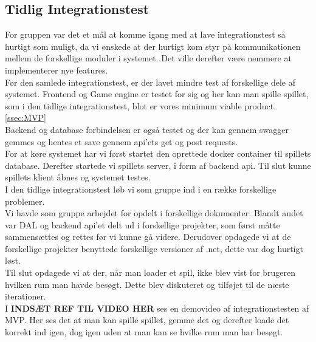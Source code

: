 \subsection{Tidlig Integrationstest}
For gruppen var det et mål at komme igang med at lave integrationstest så hurtigt som muligt, da vi ønskede at der hurtigt kom styr på kommunikationen mellem de forskellige moduler i systemet. Det ville derefter være nemmere at implementerer nye features.\\

Før den samlede integrationstest, er der lavet mindre test af forskellige dele af systemet.
Frontend og Game engine er testet for sig og her kan man spille spillet, som i den tidlige integrationstest, blot er vores minimum viable product. \autoref{ssec:MVP}\\

Backend og database forbindelsen er også testet og der kan gennem swagger gemmes og hentes et save gennem api'ets get og post requests.\\

For at køre systemet har vi først startet den oprettede docker container til spillets database. Derefter startede vi spillets server, i form af backend api. Til slut kunne spillets klient åbnes og systemet testes.\\

I den tidlige integrationstest løb vi som gruppe ind i en række forskellige problemer.\\
Vi havde som gruppe arbejdet for opdelt i forskellige dokumenter. Blandt andet var DAL og backend api'et delt ud i forskellige projekter, som først måtte sammensættes og rettes før vi kunne gå videre.
Derudover opdagede vi at de forskellige projekter benyttede forskellige versioner af .net, dette var dog hurtigt løst.\\
Til slut opdagede vi at der, når man loader et spil, ikke blev vist for brugeren hvilken rum man havde besøgt. Dette blev diskuteret og tilføjet til de næste iterationer.\\

I \textbf{INDSÆT REF TIL VIDEO HER} ses en demovideo af integrationstesten af MVP. Her ses det at man kan spille spillet, gemme det og derefter loade det korrekt ind igen, dog igen uden at man kan se hvilke rum man har besøgt.
